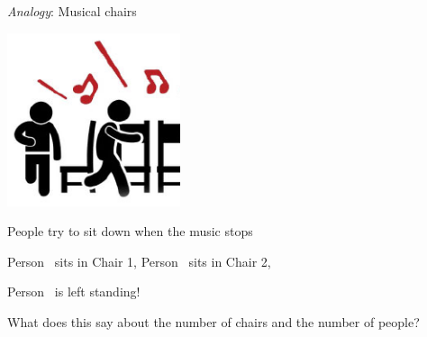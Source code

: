 
{\it Analogy}: Musical chairs

\begin{multicols}{2}
\includegraphics[width=2in]{../resources/images/musicalchairs.png}
\columnbreak

People try to sit down when the music stops

Person\sun~ sits in Chair 1,
Person\smiley~ sits in Chair 2,

Person\frownie~  is left standing!
\end{multicols}
What does this say about the number of chairs and the number of people?